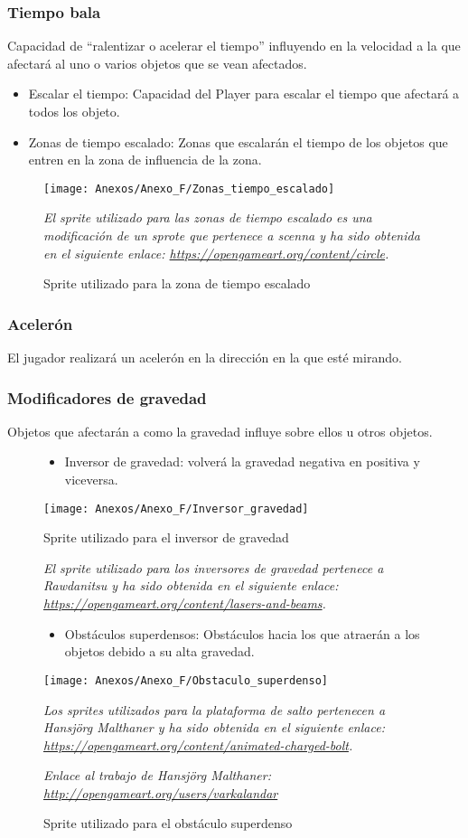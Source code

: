 \clearpage
\subsubsection{Tiempo bala}
Capacidad de “ralentizar o acelerar el tiempo” influyendo en la velocidad a la que afectará al uno o varios objetos que se vean afectados.
\begin{itemize}
\item
Escalar el tiempo: Capacidad del Player para escalar el tiempo que afectará a todos los objeto.
\item
Zonas de tiempo escalado: Zonas que escalarán el tiempo de los objetos que entren en la zona de influencia de la zona.
\end{itemize}

\begin{figure}[h]
\centering
\texttt{[image: Anexos/Anexo\_F/Zonas\_tiempo\_escalado]}
\caption{Sprite utilizado para la zona de tiempo escalado}
\raggedright
\textit{El sprite utilizado para las zonas de tiempo escalado es una modificación de un sprote que pertenece a scenna y ha sido obtenida en el siguiente enlace: \url{https://opengameart.org/content/circle}.}
\end{figure}

\subsubsection{Acelerón}
El jugador realizará un acelerón en la dirección en la que esté mirando.

\subsubsection{Modificadores de gravedad}
Objetos que afectarán a como la gravedad influye sobre ellos u otros objetos.
\begin{figure}[h]
\begin{itemize}
\item
Inversor de gravedad: volverá la gravedad negativa en positiva y viceversa.
\end{itemize}
\centering
\texttt{[image: Anexos/Anexo\_F/Inversor\_gravedad]}
\caption{Sprite utilizado para el inversor de gravedad}
\raggedright
\textit{El sprite utilizado para los inversores de gravedad pertenece a Rawdanitsu y ha sido obtenida en el siguiente enlace: \url{https://opengameart.org/content/lasers-and-beams}.}

\begin{itemize}
\item
Obstáculos superdensos: Obstáculos hacia los que atraerán a los objetos debido a su alta gravedad.
\end{itemize}
\centering
\texttt{[image: Anexos/Anexo\_F/Obstaculo\_superdenso]}
\caption{Sprite utilizado para el obstáculo superdenso}
\raggedright
\textit{Los sprites utilizados para la plataforma de salto pertenecen a Hansjörg Malthaner y ha sido obtenida en el siguiente enlace: \url{https://opengameart.org/content/animated-charged-bolt}.}

\textit{Enlace al trabajo de Hansjörg Malthaner: \url{http://opengameart.org/users/varkalandar}}
\end{figure}

